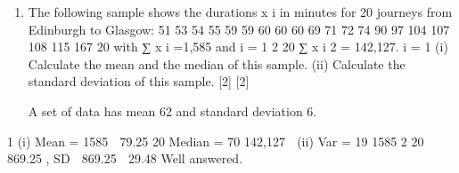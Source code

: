\documentclass[a4paper,12pt]{article}
\begin{document}
\begin{enumerate}

\item %
The following sample shows the durations x i in minutes for 20 journeys from
Edinburgh to Glasgow:
51 53 54 55 59 59 60 60 60 69 71 72 74 90 97 104 107 108 115 167
20
with
∑ x i =1,585 and
i = 1
2
20
∑ x i 2 = 142,127.
i = 1
(i) Calculate the mean and the median of this sample.
(ii) Calculate the standard deviation of this sample.
[2]
[2]

A set of data has mean 62 and standard deviation 6.


\end{enumerate}
\newpage
1
(i)
Mean =
1585
 79.25
20
Median = 70
142,127 
(ii)
Var =
19
1585 2
20  869.25 ,
SD  869.25  29.48
Well answered.
\end{document}
